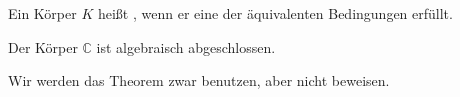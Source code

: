 \begin{definition}
	Ein Körper $K$ heißt , wenn er eine 
	der äquivalenten Bedingungen erfüllt. 
\end{definition}

\begin{theorem}
	Der Körper $\mathbb C$ ist algebraisch abgeschlossen.
\end{theorem}

\begin{remark}
	Wir werden das Theorem zwar benutzen, aber nicht beweisen.
\end{remark}